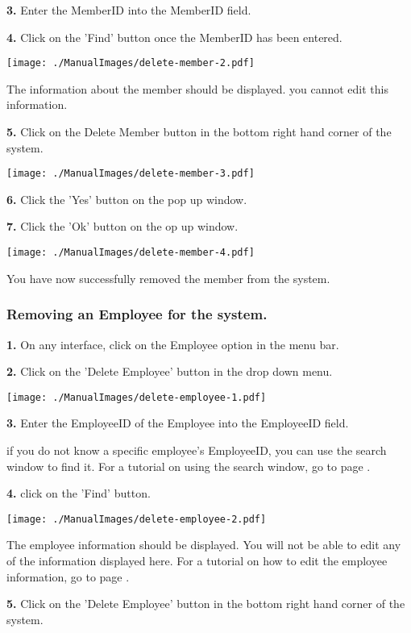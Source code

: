 \textbf{3.} Enter the MemberID into the MemberID field.

\textbf{4.} Click on the 'Find' button once the MemberID has been entered.

\texttt{[image: ./ManualImages/delete-member-2.pdf]}

The information about the member should be displayed. you cannot edit this information.

\textbf{5.} Click on the Delete Member button in the bottom right hand corner of the system. 

\texttt{[image: ./ManualImages/delete-member-3.pdf]}

\textbf{6.} Click the 'Yes' button on the pop up window.

\textbf{7.} Click the 'Ok' button on the op up window.

\texttt{[image: ./ManualImages/delete-member-4.pdf]}

You have now successfully removed the member from the system.

\pagebreak
\subsubsection{Removing an Employee for the system.}
\label{fig:Removing an Employee for the system.}

\textbf{1.} On any interface, click on the Employee option in the menu bar.

\textbf{2.} Click on the 'Delete Employee' button in the drop down menu.

\texttt{[image: ./ManualImages/delete-employee-1.pdf]}

\textbf{3.} Enter the EmployeeID of the Employee into the EmployeeID field.

if you do not know a specific employee's EmployeeID, you can use the search window to find it. For a tutorial on using the search window, go to page \pageref{fig:Using the search window}.

\textbf{4.} click on the 'Find' button.

\texttt{[image: ./ManualImages/delete-employee-2.pdf]}

The employee information should be displayed. You will not be able to edit any of the information displayed here. For a tutorial on how to edit the employee information, go to page \pageref{fig:Editing an Employee in the system}.

\textbf{5.} Click on the 'Delete Employee' button in the bottom right hand corner of the system.

